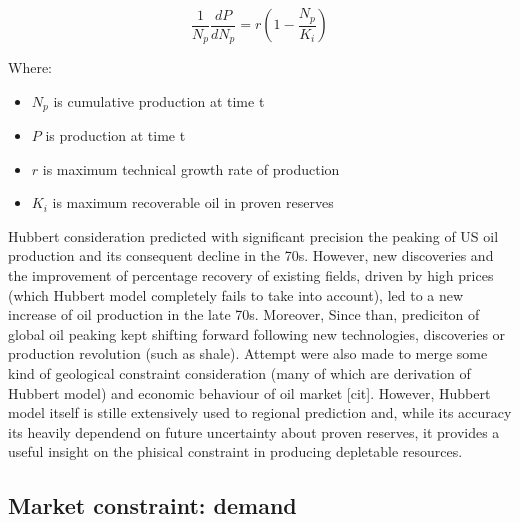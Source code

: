 \documentclass[11pt]{article} %
\begin{document}
\begin{equation}
\frac{1}{N_p}\frac{dP}{dN_p} = r(1-\frac{N_p}{K_i})
\label{s12e1}
\end{equation}

Where:
\begin{itemize}
\item $N_p$ is cumulative production at time t
\item $P$ is production at time t
\item $r$ is maximum technical growth rate of production
\item $K_i$ is maximum recoverable oil in proven reserves
\end{itemize}

Hubbert consideration predicted with significant precision the peaking of US oil production and its consequent decline in the 70s. However, new discoveries and the improvement of percentage recovery of existing fields, driven by high prices (which Hubbert model completely fails to take into account), led to a new increase of oil production in the late 70s. Moreover, 
Since than, prediciton of global oil peaking kept shifting forward following new technologies, discoveries or production revolution (such as shale). Attempt were also made to merge some kind of geological constraint consideration (many of which are derivation of Hubbert model) and economic behaviour of oil market [cit]. However, Hubbert model itself is stille extensively used to regional prediction and, while its accuracy its heavily dependend on future uncertainty about proven reserves, it provides a useful insight on the phisical constraint in producing depletable resources. 

\subsection{Market constraint: demand } \label{demand}
\end{document}
